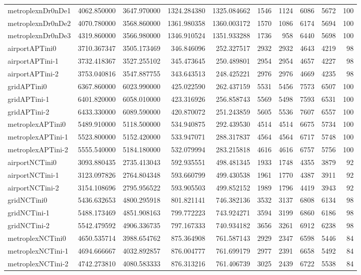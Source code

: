 \begin{longtable}{|l|r|r|r|r|r|r|r|r|r|}
metroplexnDr0nDe1 & 4062.850000 & 3647.970000 & 1324.284380 & 1325.084662 & 1546 & 1124 & 6086 & 5672 & 100 \\
metroplexnDr0nDe2 & 4070.780000 & 3568.860000 & 1361.980358 & 1360.003172 & 1570 & 1086 & 6174 & 5694 & 100 \\
metroplexnDr0nDe3 & 4319.860000 & 3566.980000 & 1346.910524 & 1351.933288 & 1736 & 958 & 6440 & 5698 & 100 \\
airportAPTini0 & 3710.367347 & 3505.173469 & 346.846096 & 252.327517 & 2932 & 2932 & 4643 & 4219 & 98 \\
airportAPTini-1 & 3732.418367 & 3527.255102 & 345.473645 & 250.489801 & 2954 & 2954 & 4657 & 4227 & 98 \\
airportAPTini-2 & 3753.040816 & 3547.887755 & 343.643513 & 248.425221 & 2976 & 2976 & 4669 & 4235 & 98 \\
gridAPTini0 & 6367.860000 & 6023.990000 & 425.022590 & 262.437159 & 5531 & 5456 & 7573 & 6507 & 100 \\
gridAPTini-1 & 6401.820000 & 6058.010000 & 423.316926 & 256.858743 & 5569 & 5498 & 7593 & 6531 & 100 \\
gridAPTini-2 & 6433.330000 & 6089.590000 & 420.870072 & 251.243859 & 5605 & 5536 & 7607 & 6557 & 100 \\
metroplexAPTini0 & 5489.910000 & 5118.500000 & 534.940875 & 292.439530 & 4514 & 4514 & 6675 & 5734 & 100 \\
metroplexAPTini-1 & 5523.800000 & 5152.420000 & 533.947071 & 288.317837 & 4564 & 4564 & 6717 & 5748 & 100 \\
metroplexAPTini-2 & 5555.540000 & 5184.180000 & 532.079994 & 283.215818 & 4616 & 4616 & 6757 & 5756 & 100 \\
airportNCTini0 & 3093.880435 & 2735.413043 & 592.935551 & 498.481345 & 1933 & 1748 & 4355 & 3879 & 92 \\
airportNCTini-1 & 3123.097826 & 2764.804348 & 593.660799 & 499.430538 & 1961 & 1770 & 4387 & 3911 & 92 \\
airportNCTini-2 & 3154.108696 & 2795.956522 & 593.905503 & 499.852152 & 1989 & 1796 & 4419 & 3943 & 92 \\
gridNCTini0 & 5436.632653 & 4800.295918 & 801.821141 & 746.382136 & 3532 & 3137 & 6808 & 6134 & 98 \\
gridNCTini-1 & 5488.173469 & 4851.908163 & 799.772223 & 743.924271 & 3594 & 3199 & 6860 & 6186 & 98 \\
gridNCTini-2 & 5542.479592 & 4906.336735 & 797.167333 & 740.934182 & 3656 & 3261 & 6912 & 6238 & 98 \\
metroplexNCTini0 & 4650.535714 & 3988.654762 & 875.364908 & 761.587143 & 2929 & 2347 & 6598 & 5446 & 84 \\
metroplexNCTini-1 & 4694.666667 & 4032.892857 & 876.004777 & 761.699179 & 2977 & 2391 & 6658 & 5492 & 84 \\
metroplexNCTini-2 & 4742.273810 & 4080.583333 & 876.313216 & 761.406739 & 3025 & 2439 & 6722 & 5538 & 84 \\
\end{longtable}
